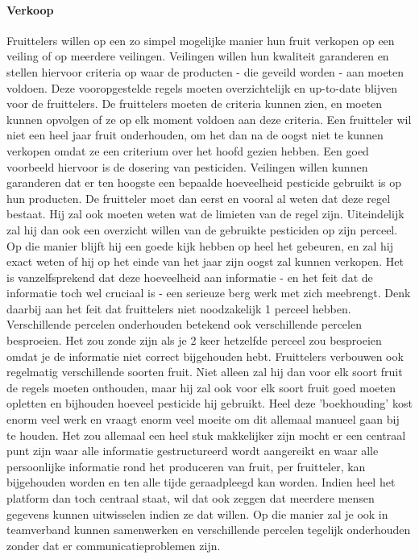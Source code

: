 \paragraph {Verkoop} Fruittelers willen op een zo simpel mogelijke manier hun fruit verkopen op een veiling of op meerdere veilingen. Veilingen willen hun kwaliteit garanderen en stellen hiervoor criteria op waar de producten - die geveild worden - aan moeten voldoen. Deze vooropgestelde regels moeten overzichtelijk en up-to-date blijven voor de fruittelers. De fruittelers moeten de criteria kunnen zien, en moeten kunnen opvolgen of ze op elk moment voldoen aan deze criteria. Een fruitteler wil niet een heel jaar fruit onderhouden, om het dan na de oogst niet te kunnen verkopen omdat ze een criterium over het hoofd gezien hebben. Een goed voorbeeld hiervoor is de dosering van pesticiden. Veilingen willen kunnen garanderen dat er ten hoogste een bepaalde hoeveelheid pesticide gebruikt is op hun producten. De fruitteler moet dan eerst en vooral al weten dat deze regel bestaat. Hij zal ook moeten weten wat de limieten van de regel zijn. Uiteindelijk zal hij dan ook een overzicht willen van de gebruikte pesticiden op zijn perceel. Op die manier blijft hij een goede kijk hebben op heel het gebeuren, en zal hij exact weten of hij op het einde van het jaar zijn oogst zal kunnen verkopen. Het is vanzelfsprekend dat deze hoeveelheid aan informatie - en het feit dat de informatie toch wel cruciaal is - een serieuze berg werk met zich meebrengt. Denk daarbij aan het feit dat fruittelers niet noodzakelijk 1 perceel hebben. Verschillende percelen onderhouden betekend ook verschillende percelen besproeien. Het zou zonde zijn als je 2 keer hetzelfde perceel zou besproeien omdat je de informatie niet correct bijgehouden hebt. Fruittelers verbouwen ook regelmatig verschillende soorten fruit. Niet alleen zal hij dan voor elk soort fruit de regels moeten onthouden, maar hij zal ook voor elk soort fruit goed moeten opletten en bijhouden hoeveel pesticide hij gebruikt. Heel deze 'boekhouding' kost enorm veel werk en vraagt enorm veel moeite om dit allemaal manueel gaan bij te houden. Het zou allemaal een heel stuk makkelijker zijn mocht er een centraal punt zijn waar alle informatie gestructureerd wordt aangereikt en waar alle persoonlijke informatie rond het produceren van fruit, per fruitteler, kan bijgehouden worden en ten alle tijde geraadpleegd kan worden. Indien heel het platform dan toch centraal staat, wil dat ook zeggen dat meerdere mensen gegevens kunnen uitwisselen indien ze dat willen. Op die manier zal je ook in teamverband kunnen samenwerken en verschillende percelen tegelijk onderhouden zonder dat er communicatieproblemen zijn.

